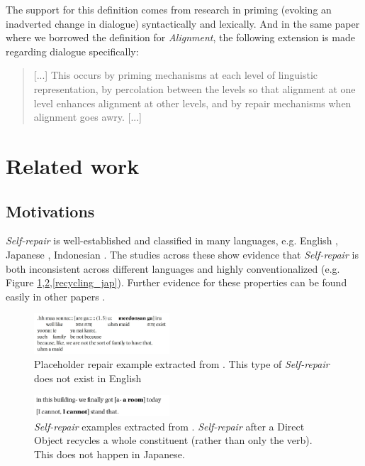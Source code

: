 \documentclass[11pt]{article}
\begin{document}
The support for this definition comes from research in priming (evoking an inadverted change in dialogue) syntactically \cite{Branigan2000} and lexically\cite{bock1986meaning}. And in the same paper where we borrowed the definition for \emph{Alignment}, the following extension is made regarding dialogue specifically:

\begin{quote}
	[...] This occurs by priming mechanisms at each level of linguistic representation, by percolation between the levels so that alignment at one level enhances alignment at other levels, and by repair mechanisms when alignment goes awry. [...]
\end{quote}




\section{Related work}

\subsection{Motivations}

\emph{Self-repair} is well-established and classified in many languages, e.g. English \cite{shriberg1994preliminaries}, Japanese \cite{hayashi1994comparative}, Indonesian \cite{wouk2005syntax}. The studies across these show evidence that \emph{Self-repair} is both inconsistent across different languages and highly conventionalized (e.g. Figure \ref{placeholder_repair_jap},\ref{recycling_eng},\ref{recycling_jap}). Further evidence for these properties can be found easily in other papers \cite{fox20102487}.  
\begin{figure}[h]
	
	\centering
	\includegraphics[width=0.45\textwidth]{placeholder_repair_jap}
	\caption{Placeholder repair example extracted from \cite{wouk2005syntax}. This type of \emph{Self-repair} does not exist in English}
	\label{placeholder_repair_jap}
\end{figure}


\begin{figure}[h]
	
	\centering
	\includegraphics[width=0.45\textwidth]{recycling_eng}
	\caption{\emph{Self-repair} examples extracted from \cite{wouk2005syntax}. \emph{Self-repair} after a Direct Object recycles a whole constituent (rather than only the verb). This does not happen in Japanese.}
	\label{recycling_eng}
\end{figure}
\end{document}
